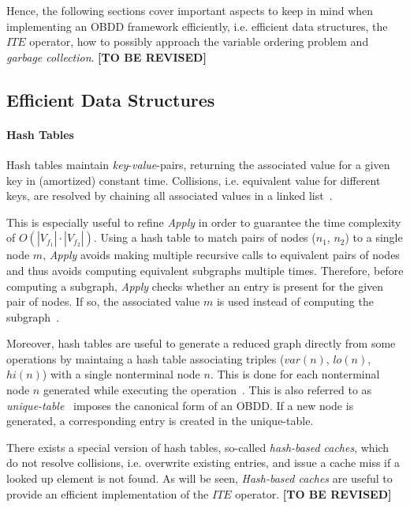 \documentclass{vldb}
\newcommand{\tbr}{\textbf{[TO BE REVISED]}}
\begin{document}
Hence, the following sections cover important aspects to keep in mind when
implementing an OBDD framework efficiently, i.e. efficient data structures, the
$ITE$ operator, how to possibly approach the variable ordering problem and
\textit{garbage collection}. \tbr

\subsection{Efficient Data Structures}
\label{subsec:efficient-data-structures}

\paragraph*{Hash Tables}
\mbox{} %

Hash tables maintain \textit{key}-\textit{value}-pairs, returning the associated
value for a given key in (amortized) constant time. Collisions, i.e. equivalent
value for different keys, are resolved by chaining all associated values in a 
linked list~\cite{BRACE90}.

This is especially useful to refine \textit{Apply} in order to guarantee the time
complexity of $O\left(|V_{f_1}| \cdot |V_{f_2}|\right)$. Using a hash table to
match pairs of nodes ($n_1$, $n_2$) to a single node $m$, \textit{Apply} avoids
making multiple recursive calls to equivalent pairs of nodes and thus avoids
computing equivalent subgraphs multiple times. Therefore, before computing a
subgraph, \textit{Apply} checks whether an entry is present for the given pair
of nodes. If so, the associated value $m$ is used instead of computing the
subgraph~\cite{BRYANT86, BRYANT92}.

Moreover, hash tables are useful to generate a reduced graph directly from some
operations by maintaing a hash table associating triples
($var(n)$, $lo(n)$, $hi(n)$) with a single nonterminal node $n$. This is done for
each nonterminal node $n$ generated while executing the
operation~\cite{BRYANT92}. This is also referred to as
\textit{unique-table}~\cite{BRACE90} imposes the canonical form of an OBDD. If a
new node is generated, a corresponding entry is created in the unique-table.

There exists a special version of hash tables, so-called
\textit{hash-based caches}, which do not resolve collisions, i.e. overwrite
existing entries, and issue a cache miss if a looked up element is not found.
As will be seen, \textit{Hash-based caches} are useful to provide an efficient
implementation of the $ITE$ operator. \tbr
\end{document}
